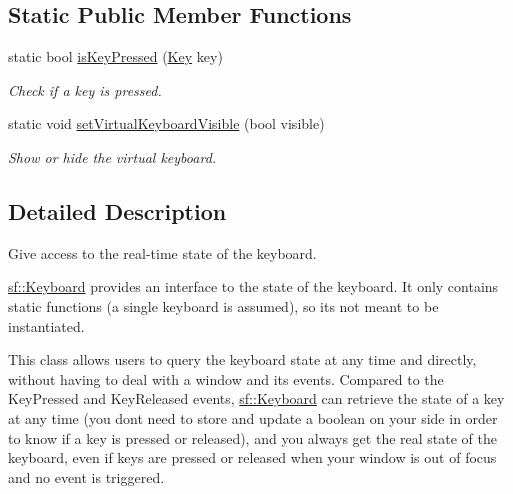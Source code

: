 \subsection*{Static Public Member Functions}
\begin{DoxyCompactItemize}
\item 
static bool \hyperlink{classsf_1_1_keyboard_a80a04b2f53005886957f49eee3531599}{is\+Key\+Pressed} (\hyperlink{classsf_1_1_keyboard_acb4cacd7cc5802dec45724cf3314a142}{Key} key)
\begin{DoxyCompactList}\small\item\em Check if a key is pressed. \end{DoxyCompactList}\item 
static void \hyperlink{classsf_1_1_keyboard_ad61fee7e793242d444a8c5acd662fe5b}{set\+Virtual\+Keyboard\+Visible} (bool visible)
\begin{DoxyCompactList}\small\item\em Show or hide the virtual keyboard. \end{DoxyCompactList}\end{DoxyCompactItemize}


\subsection{Detailed Description}
Give access to the real-\/time state of the keyboard. 

\hyperlink{classsf_1_1_keyboard}{sf\+::\+Keyboard} provides an interface to the state of the keyboard. It only contains static functions (a single keyboard is assumed), so it\textquotesingle{}s not meant to be instantiated.

This class allows users to query the keyboard state at any time and directly, without having to deal with a window and its events. Compared to the Key\+Pressed and Key\+Released events, \hyperlink{classsf_1_1_keyboard}{sf\+::\+Keyboard} can retrieve the state of a key at any time (you don\textquotesingle{}t need to store and update a boolean on your side in order to know if a key is pressed or released), and you always get the real state of the keyboard, even if keys are pressed or released when your window is out of focus and no event is triggered.

